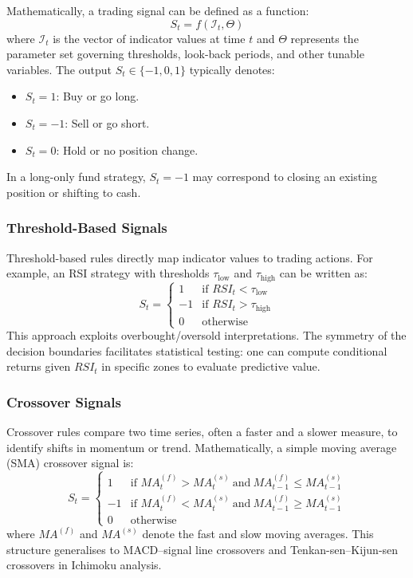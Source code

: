 Mathematically, a trading signal can be defined as a function:
\[
S_t = f(\mathcal{I}_t, \Theta)
\]
where $\mathcal{I}_t$ is the vector of indicator values at time $t$ and $\Theta$ represents the parameter set governing thresholds, look-back periods, and other tunable variables. The output $S_t \in \{-1, 0, 1\}$ typically denotes:
\begin{itemize}
    \item $S_t = 1$: Buy or go long.
    \item $S_t = -1$: Sell or go short.
    \item $S_t = 0$: Hold or no position change.
\end{itemize}
In a long-only fund strategy, $S_t = -1$ may correspond to closing an existing position or shifting to cash.

\subsubsection{Threshold-Based Signals}

Threshold-based rules directly map indicator values to trading actions. For example, an RSI strategy with thresholds $\tau_{\text{low}}$ and $\tau_{\text{high}}$ can be written as:
\[
S_t =
\begin{cases}
1 & \text{if } RSI_t < \tau_{\text{low}} \\
-1 & \text{if } RSI_t > \tau_{\text{high}} \\
0 & \text{otherwise}
\end{cases}
\]
This approach exploits overbought/oversold interpretations. The symmetry of the decision boundaries facilitates statistical testing: one can compute conditional returns given $RSI_t$ in specific zones to evaluate predictive value.

\subsubsection{Crossover Signals}

Crossover rules compare two time series, often a faster and a slower measure, to identify shifts in momentum or trend. Mathematically, a simple moving average (SMA) crossover signal is:
\[
S_t =
\begin{cases}
1 & \text{if } MA^{(f)}_t > MA^{(s)}_t \ \text{and} \ MA^{(f)}_{t-1} \le MA^{(s)}_{t-1} \\
-1 & \text{if } MA^{(f)}_t < MA^{(s)}_t \ \text{and} \ MA^{(f)}_{t-1} \ge MA^{(s)}_{t-1} \\
0 & \text{otherwise}
\end{cases}
\]
where $MA^{(f)}$ and $MA^{(s)}$ denote the fast and slow moving averages. This structure generalises to MACD–signal line crossovers and Tenkan-sen–Kijun-sen crossovers in Ichimoku analysis.

